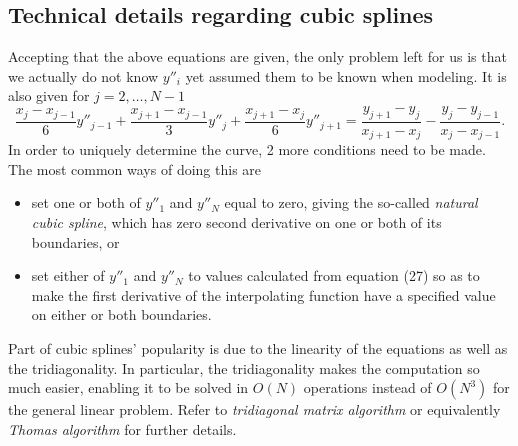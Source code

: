 \documentclass[11pt]{article}
\begin{document}
 \subsection{Technical details regarding cubic splines}
 Accepting that the above equations are given, the only problem left for us is that we actually do not know $y''_{i}$ yet assumed them to be known when modeling. It is also given for $j=2, \ldots , N-1$
 \begin{equation}
  \frac{x_{j}-x_{j-1}}{6}y''_{j-1} + \frac{x_{j+1}-x_{j-1}}{3}y''_{j} + \frac{x_{j+1}-x_{j}}{6}y''_{j+1} = \frac{y_{j+1}-y_{j}}{x_{j+1}-x_{j}} - \frac{y_{j}-y_{j-1}}{x_{j}-x_{j-1}}.
 \end{equation}
 In order to uniquely determine the curve, 2 more conditions need to be made. The most common ways of doing this are
 \begin{itemize}
  \item set one or both of $y''_{1}$ and $y''_{N}$ equal to zero, giving the so-called \emph{natural cubic spline}, which has zero second derivative on one or both of its boundaries, or
  \item set either of $y''_{1}$ and $y''_{N}$ to values calculated from equation (27) so as to make the first derivative of the interpolating function have a specified value on either or both boundaries.
 \end{itemize}
Part of cubic splines' popularity is due to the linearity of the equations as well as the tridiagonality. In particular, the tridiagonality makes the computation so much easier, enabling it to be solved in $O\left(N\right)$ operations instead of $O\left(N^{3}\right)$ for the general linear problem. Refer to \emph{tridiagonal matrix algorithm} or equivalently \emph{Thomas algorithm} for further details.
\end{document}
